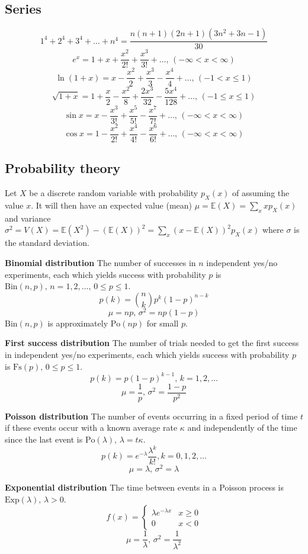 \documentclass[a4paper,11pt,oneside]{article}
\begin{document}
\begin{multicols*}{\COLS}
\subsection{\small Series}
$$1^4 + 2^4 + 3^4 + \dots + n^4 = \frac{n(n+1)(2n+1)(3n^2 + 3n - 1)}{30}$$
$$e^x = 1+x+\frac{x^2}{2!}+\frac{x^3}{3!}+\dots,\,(-\infty<x<\infty)$$
$$\ln(1+x) = x-\frac{x^2}{2}+\frac{x^3}{3}-\frac{x^4}{4}+\dots,\,(-1<x\leq1)$$
$$\sqrt{1+x} = 1+\frac{x}{2}-\frac{x^2}{8}+\frac{2x^3}{32}-\frac{5x^4}{128}+\dots,\,(-1\leq x\leq1)$$
$$\sin x = x-\frac{x^3}{3!}+\frac{x^5}{5!}-\frac{x^7}{7!}+\dots,\,(-\infty<x<\infty)$$
$$\cos x = 1-\frac{x^2}{2!}+\frac{x^4}{4!}-\frac{x^6}{6!}+\dots,\,(-\infty<x<\infty)$$

\subsection{\small Probability theory}
Let $X$ be a discrete random variable with probability $p_X(x)$ of assuming the value $x$. It will then have an expected value (mean) $\mu=\mathbb{E}(X)=\sum_xxp_X(x)$ and variance $\sigma^2=V(X)=\mathbb{E}(X^2)-(\mathbb{E}(X))^2=\sum_x(x-\mathbb{E}(X))^2p_X(x)$ where $\sigma$ is the standard deviation.

\textbf{\small Binomial distribution}
The number of successes in $n$ independent yes/no experiments, each which yields success with probability $p$ is $\textrm{Bin}(n,p),\,n=1,2,\dots,\, 0\leq p\leq1$.
\[p(k)=\binom{n}{k}p^k(1-p)^{n-k}\]
\[\mu = np,\,\sigma^2=np(1-p)\]
$\textrm{Bin}(n,p)$ is approximately $\textrm{Po}(np)$ for small $p$.

\textbf{\small First success distribution}
The number of trials needed to get the first success in independent yes/no experiments, each which yields success with probability $p$ is $\textrm{Fs}(p),\,0\leq p\leq1$.
\[p(k)=p(1-p)^{k-1},\,k=1,2,\dots\]
\[\mu = \frac1p,\,\sigma^2=\frac{1-p}{p^2}\]

\textbf{\small Poisson distribution}
The number of events occurring in a fixed period of time $t$ if these events occur with a known average rate $\kappa$ and independently of the time since the last event is $\textrm{Po}(\lambda),\,\lambda=t\kappa$.
\[p(k)=e^{-\lambda}\frac{\lambda^k}{k!}, k=0,1,2,\dots\]
\[\mu=\lambda,\,\sigma^2=\lambda\]

\textbf{\small Exponential distribution}
The time between events in a Poisson process is $\textrm{Exp}(\lambda),\,\lambda>0$.
\[f(x) = \left\{
\begin{array}{cl}
\lambda e^{-\lambda x} & x\geq0\\
0 & x<0
\end{array}\right.\]
\[\mu=\frac{1}{\lambda},\,\sigma^2=\frac{1}{\lambda^2}\]


\end{multicols*}
\end{document}
